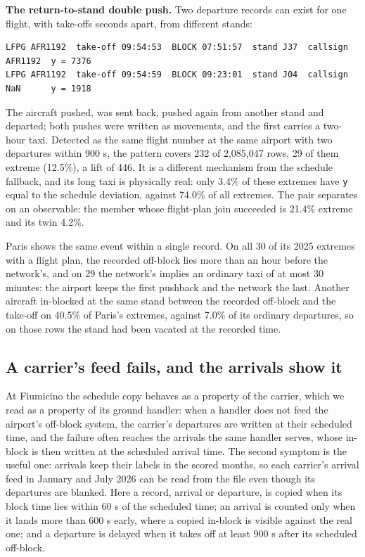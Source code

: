 \documentclass[
  manuscript=article,
  layout=preprint,
  year=2026,
  volume=x,
]{extra/joas}
\begin{document}
\textbf{The return-to-stand double push.} Two departure records can exist for one flight, with take-offs seconds apart, from different stands:

\begin{footnotesize}
\begin{verbatim}
LFPG AFR1192  take-off 09:54:53  BLOCK 07:51:57  stand J37  callsign AFR1192  y = 7376
LFPG AFR1192  take-off 09:54:59  BLOCK 09:23:01  stand J04  callsign NaN      y = 1918
\end{verbatim}
\end{footnotesize}

The aircraft pushed, was sent back, pushed again from another stand and departed; both pushes were written as movements, and the first carries a two-hour taxi. Detected as the same flight number at the same airport with two departures within 900 s, the pattern covers 232 of 2,085,047 rows, 29 of them extreme (12.5\%), a lift of 446. It is a different mechanism from the schedule fallback, and its long taxi is physically real: only 3.4\% of these extremes have \texttt{y} equal to the schedule deviation, against 74.0\% of all extremes. The pair separates on an observable: the member whose flight-plan join succeeded is 21.4\% extreme and its twin 4.2\%.

Paris shows the same event within a single record. On all 30 of its 2025 extremes with a flight plan, the recorded off-block lies more than an hour before the network's, and on 29 the network's implies an ordinary taxi of at most 30 minutes: the airport keeps the first pushback and the network the last. Another aircraft in-blocked at the same stand between the recorded off-block and the take-off on 40.5\% of Paris's extremes, against 7.0\% of its ordinary departures, so on those rows the stand had been vacated at the recorded time.

\subsection{A carrier's feed fails, and the arrivals show it}\label{sec:4.6}

At Fiumicino the schedule copy behaves as a property of the carrier, which we read as a property of its ground handler: when a handler does not feed the airport's off-block system, the carrier's departures are written at their scheduled time, and the failure often reaches the arrivals the same handler serves, whose in-block is then written at the scheduled arrival time. The second symptom is the useful one: arrivals keep their labels in the scored months, so each carrier's arrival feed in January and July 2026 can be read from the file even though its departures are blanked. Here a record, arrival or departure, is copied when its block time lies within 60 s of the scheduled time; an arrival is counted only when it lands more than 600 s early, where a copied in-block is visible against the real one; and a departure is delayed when it takes off at least 900 s after its scheduled off-block.
\end{document}
